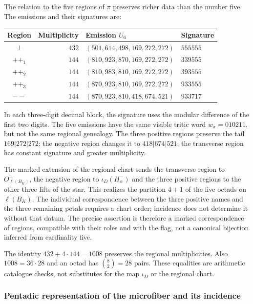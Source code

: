 The relation to the five regions of $\pi$ preserves richer data
than the number five. The emissions and their signatures are:
\begin{center}
\small
\begin{tabular}{@{}crll@{}}
\toprule
Region & Multiplicity & Emission $U_6$ & Signature \\
\midrule
$\perp$ & $432$ & $(501,614,498,169,272,272)$ & $555555$ \\
$++_1$ & $144$ & $(810,923,870,169,272,272)$ & $339555$ \\
$++_2$ & $144$ & $(810,983,810,169,272,272)$ & $393555$ \\
$++_3$ & $144$ & $(870,923,810,169,272,272)$ & $933555$ \\
$--$ & $144$ & $(870,923,810,418,674,521)$ & $933717$ \\
\bottomrule
\end{tabular}
\end{center}
In each three-digit decimal block, the signature uses the modular
difference of the first two digits. The five emissions have the
same visible tritic word $w_\pi=010211$, but not the same
regional genealogy. The three positive regions preserve the tail
$169|272|272$; the negative region changes it to $418|674|521$;
the transverse region has constant signature and greater multiplicity.

The marked extension of the regional chart sends the transverse region
to $O_{\ell(B_K)}^\perp$, the negative region to $\iota_D(H^-_\alpha)$ and the
three positive regions to the other three lifts of the star. This
realizes the partition $4+1$ of the five octads on $\ell(B_K)$.
The individual correspondence between the three positive names and
the three remaining petals requires a chart order; incidence does not determine it
without that datum. The precise assertion is therefore a
marked correspondence of regions, compatible with their roles and with
the flag, not a canonical bijection inferred from cardinality five.

The identity $432+4\cdot144=1008$ preserves the regional
multiplicities. Also $1008=36\cdot28$ and an octad has
$\binom82=28$ pairs. These equalities are arithmetic catalogue checks,
not substitutes for the map $\iota_D$ or the regional chart.


\subsubsection{Pentadic representation of the microfiber and its incidence}
\label{x_reciprocidad:pi-estrella:desarrollo}

